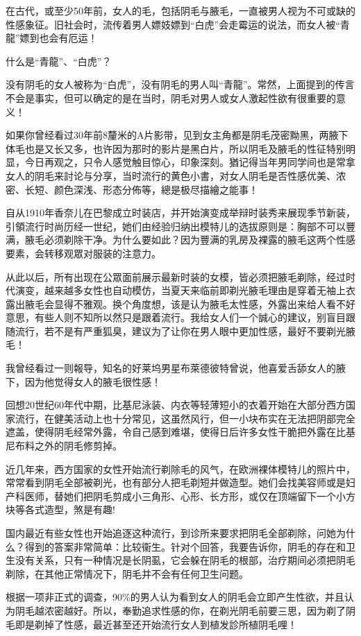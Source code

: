 \documentclass[12pt,UTF8]{ctexbook}
\begin{document}
在古代，或至少50年前，女人的毛，包括阴毛与腋毛，一直被男人视为不可或缺的性感象征。旧社会时，流传着男人嫖妓嫖到“白虎”会走霉运的说法，而女人被“青龍”嫖到也会有厄运！

什么是“青龍”、“白虎”？

没有阴毛的女人被称为“白虎”，没有阴毛的男人叫“青龍”。常然，上面提到的传言不会是事实，但可以确定的是在当时，阴毛对男人或女人激起性欲有很重要的意义！

如果你曾经看过30年前8釐米的A片影带，见到女主角都是阴毛茂密黝黑，两腋下体毛也是又长又多，也许因为那时的影片是黑白片，所以阴毛及腋毛的性征特别明显，今日再观之，只令人感觉触目惊心，印象深刻。猶记得当年男同学间也是常拿女人的阴毛来討论与分享，当时流行的黄色小書，对女人阴毛是否性感优美、浓密、长短、颜色深浅、形态分佈等，總是极尽描繪之能事！

自从1910年香奈儿在巴黎成立时装店，并开始演变成举辩时装秀来展现季节新装，引領流行时尚历经一世纪，她们由经验归纳出模特儿的选拔原则是：胸部不可以豐满，腋毛必须剃除干净。为什么要如此？因为豐满的乳房及裸露的腋毛这两个性感要素，会转移观眾对服装的注意力。

从此以后，所有出现在公眾面前展示最新时装的女模，皆必须把腋毛剃除，经过时代演变，越来越多女性也自动模仿，当夏天来临前即剃光腋毛理由是穿着无袖上衣露出腋毛会显得不雅观。换个角度想，该是认为腋毛太性感，外露出来给人看不好意思，有些人则不知所以然只是跟着流行。我给女人们一个誠心的建议，别盲目跟随流行，若不是有严重狐臭，建议为了让你在男人眼中更加性感，最好不要剃光腋毛！

我曾经看过一则報导，知名的好莱坞男星布萊德彼特曾说，他喜爱舌舔女人的腋下，因为他觉得女人的腋毛很性感！

回想20世纪60年代中期，比基尼泳装、内衣等轻薄短小的衣着开始在大部分西方国家流行，在健美活动上也十分常见，这虽然风行，但一小块布实在无法把阴部完全遮盖，使得阴毛经常外露，令自己感到难堪，使得日后许多女性干脆把外露在比基尼布料之外的阴毛修剪掉。

近几年来，西方国家的女性开始流行剃除毛的风气，在欧洲裸体模特儿的照片中，常常看到阴毛全部被剃光，也有部分人把毛剃短并做造型。她们会找美容师或是妇产科医师，替她们把阴毛剪成小三角形、心形、长方形，或仅在顶端留下一个小方块等各式造型，煞是有趣!

国内最近有些女性也开始追逐这种流行，到诊所来要求把阴毛全部剃除，问她为什么？得到的答案非常简单：比较衞生。针对个回答，我要告诉你，阴毛的存在和卫生没有关系，只有一种情况是长阴虱，它会躲在阴毛的根部，治疗期间必须把阴毛剃除，在其他正常情况下，阴毛并不会有任何卫生问题。

根据一项非正式的调查，90\%的男人认为看到女人的阴毛会立即产生性欲，并且认为阴毛越浓密越好。所以，奉勤追求性感的你，在剃光阴毛前要三思，因为剃了阴毛即是剃掉了性感，最近甚至还开始流行女人到植发診所植阴毛哩！
\end{document}
